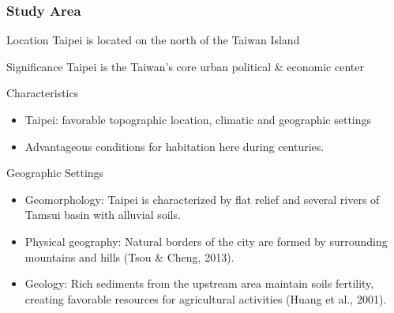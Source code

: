 \documentclass[pdflatex,compress,8pt,
	xcolor={dvipsnames,dvipsnames,svgnames,x11names,table},
	hyperref={	
	breaklinks = true, 
	pdfauthor={Lemenkova Polina}, 
	pdfsubject={Preentation}, 
	pdfcreator={Lemenkova Polina}, 
	pdfproducer={Lemenkova Polina}, 
	colorlinks=true,
	linkcolor=Gold1, 
	citecolor=NavyBlue, 
	urlcolor = NavyBlue, 
	breaklinks = true}]{beamer}
\begin{document}
\begin{frame}\frametitle{Study Area}
	\begin{alertblock}{Location}
Taipei is located on the north of the Taiwan Island
	\end{alertblock}
	
	\begin{block}{Significance}
Taipei is the Taiwan's core urban political \& economic center
	\end{block}

	\begin{block}{Characteristics}
		\begin{itemize}
			\item Taipei: favorable \alert{topographic} location, \alert{climatic} and \alert{geographic} settings 
			\item Advantageous conditions for habitation here during centuries.
		\end{itemize}
	\end{block}

	\begin{examples}{Geographic Settings}
		\begin{itemize}
			\item  Geomorphology: Taipei is characterized by flat relief and several rivers of Tamsui basin with alluvial soils. 
			\item Physical geography: Natural borders of the city are formed by surrounding mountains and hills	(Tsou \& Cheng, 2013).
			\item Geology: Rich sediments from the upstream area maintain soils fertility, creating favorable resources for agricultural activities (Huang et al., 2001).
		\end{itemize}
	\end{examples}
\end{frame}
\end{document}
